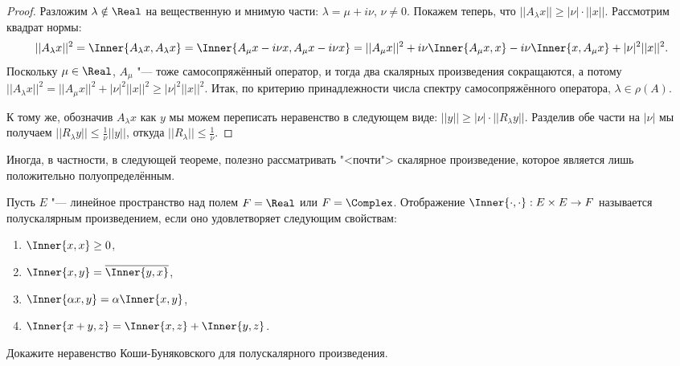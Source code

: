 \documentclass[main]{subfiles}
\begin{document}
\begin{proof}
  Разложим \( \lambda \notin \Real \)
  на вещественную и мнимую части:
  \( \lambda = \mu + i \nu \),
  \( \nu \ne 0 \).
  Покажем теперь, что
  \( ||A_\lambda x|| \ge |\nu| \cdot ||x|| \).
  Рассмотрим квадрат нормы:
  \[
    ||A_\lambda x||^2 =
    \Inner{A_\lambda x, A_\lambda x} =
    \Inner{A_\mu x - i \nu x, A_\mu x - i \nu x} =
    ||A_\mu x||^2 + i \nu \Inner{A_\mu x, x}
    - i \nu \Inner{x, A_\mu x} + |\nu|^2 ||x||^2.
  \]
  Поскольку \( \mu \in \Real \),
  \( A_\mu \) "--- тоже самосопряжённый оператор,
  и тогда два скалярных произведения сокращаются,
  а потому \( ||A_\lambda x||^2 = ||A_\mu x||^2 +
  |\nu|^2 ||x||^2 \ge |\nu|^2 ||x||^2 \).
  Итак, по критерию принадлежности числа спектру
  самосопряжённого оператора, \( \lambda \in \rho(A) \).

  К тому же, обозначив \( A_\lambda x \) как \( y \)
  мы можем переписать неравенство в следующем виде:
  \( ||y|| \ge |\nu| \cdot ||R_\lambda y|| \).
  Разделив обе части на \( |\nu| \) мы получаем
  \( ||R_\lambda y|| \le \frac1\nu ||y|| \),
  откуда \( ||R_\lambda|| \le \frac1\nu \).
\end{proof}

Иногда, в частности, в следующей теореме,
полезно рассматривать "<почти"> скалярное произведение,
которое является лишь положительно полуопределённым.

\begin{definition}
  Пусть \( E \) "--- линейное пространство
  над полем \( F = \Real \) или \( F = \Complex \).
  Отображение
  \( \Inner{\cdot, \cdot} : E \times E \to F \)
  называется полускалярным произведением,
  если оно удовлетворяет следующим свойствам:
  \begin{enumerate}
    \item \( \Inner{x, x} \ge 0 \),
    \item \( \Inner{x, y} = \overline{\Inner{y, x}} \),
    \item \( \Inner{\alpha x, y} = \alpha \Inner{x, y} \),
    \item \( \Inner{x + y, z} = \Inner{x, z} + \Inner{y, z} \).
  \end{enumerate}
\end{definition}

\begin{exercise}
  Докажите неравенство Коши-Буняковского для полускалярного
  произведения.
\end{exercise}
\end{document}
